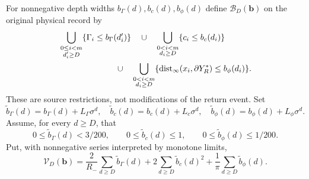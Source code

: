 For nonnegative depth widths $b_\Gamma(d),b_c(d),b_\phi(d)$ define
$\mathcal B_D(\boldsymbol b)$ on the original physical record by
\begin{align*}
 &\bigcup_{\substack{0\le i<m\\d'_i\ge D}}
                 \{\Gamma_i\le b_\Gamma(d'_i)\}\quad\cup\quad
   \bigcup_{\substack{0<i<m\\d_i\ge D}}
                 \{c_i\le b_c(d_i)\}\\
 &\hspace{24mm}\cup\quad
   \bigcup_{\substack{0<i<m\\d_i\ge D}}
      \{\operatorname{dist}_\infty(x_i,\partial Y_R^*)
                                             \le b_\phi(d_i)\}.
\end{align*}
These are source restrictions, not modifications of the return event.
Set
\begin{equation}\label{eq:cv-enlarged-widths}
 \widetilde b_\Gamma(d)=b_\Gamma(d)+L_\Gamma\sigma^d,
 \quad \widetilde b_c(d)=b_c(d)+L_c\sigma^d,
 \quad \widetilde b_\phi(d)=b_\phi(d)+L_\phi\sigma^d.
\end{equation}
Assume, for every $d\ge D$, that
\begin{equation}\label{eq:cv-width-regime}
 0\le\widetilde b_\Gamma(d)<3/200,\qquad
 0\le\widetilde b_c(d)\le1,\qquad
 0\le\widetilde b_\phi(d)\le1/200.
\end{equation}
Put, with nonnegative series interpreted by monotone limits,
\begin{equation}\label{eq:cv-unconditioned-budget}
 \mathcal V_D(\boldsymbol b)
  =\frac2{R_-}\sum_{d\ge D}\widetilde b_\Gamma(d)
       +2\sum_{d\ge D}\widetilde b_c(d)^2
       +\frac1\pi\sum_{d\ge D}\widetilde b_\phi(d).
\end{equation}

